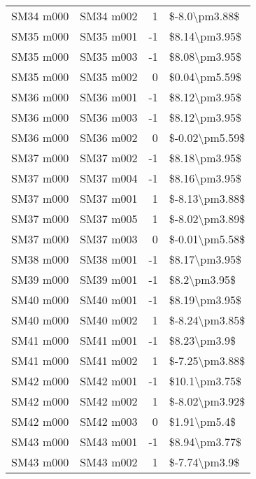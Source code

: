 \begin{longtable}{llrl}
 SM34 m000 &     SM34 m002 &       1 &    \$-8.0\textbackslash pm3.88\$ \\
 SM35 m000 &     SM35 m001 &      -1 &    \$8.14\textbackslash pm3.95\$ \\
 SM35 m000 &     SM35 m003 &      -1 &    \$8.08\textbackslash pm3.95\$ \\
 SM35 m000 &     SM35 m002 &       0 &    \$0.04\textbackslash pm5.59\$ \\
 SM36 m000 &     SM36 m001 &      -1 &    \$8.12\textbackslash pm3.95\$ \\
 SM36 m000 &     SM36 m003 &      -1 &    \$8.12\textbackslash pm3.95\$ \\
 SM36 m000 &     SM36 m002 &       0 &   \$-0.02\textbackslash pm5.59\$ \\
 SM37 m000 &     SM37 m002 &      -1 &    \$8.18\textbackslash pm3.95\$ \\
 SM37 m000 &     SM37 m004 &      -1 &    \$8.16\textbackslash pm3.95\$ \\
 SM37 m000 &     SM37 m001 &       1 &   \$-8.13\textbackslash pm3.88\$ \\
 SM37 m000 &     SM37 m005 &       1 &   \$-8.02\textbackslash pm3.89\$ \\
 SM37 m000 &     SM37 m003 &       0 &   \$-0.01\textbackslash pm5.58\$ \\
 SM38 m000 &     SM38 m001 &      -1 &    \$8.17\textbackslash pm3.95\$ \\
 SM39 m000 &     SM39 m001 &      -1 &     \$8.2\textbackslash pm3.95\$ \\
 SM40 m000 &     SM40 m001 &      -1 &    \$8.19\textbackslash pm3.95\$ \\
 SM40 m000 &     SM40 m002 &       1 &   \$-8.24\textbackslash pm3.85\$ \\
 SM41 m000 &     SM41 m001 &      -1 &     \$8.23\textbackslash pm3.9\$ \\
 SM41 m000 &     SM41 m002 &       1 &   \$-7.25\textbackslash pm3.88\$ \\
 SM42 m000 &     SM42 m001 &      -1 &    \$10.1\textbackslash pm3.75\$ \\
 SM42 m000 &     SM42 m002 &       1 &   \$-8.02\textbackslash pm3.92\$ \\
 SM42 m000 &     SM42 m003 &       0 &     \$1.91\textbackslash pm5.4\$ \\
 SM43 m000 &     SM43 m001 &      -1 &    \$8.94\textbackslash pm3.77\$ \\
 SM43 m000 &     SM43 m002 &       1 &    \$-7.74\textbackslash pm3.9\$ \\

\end{longtable}
